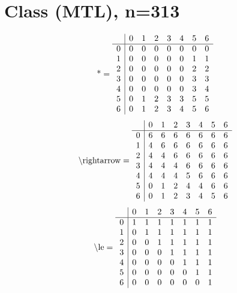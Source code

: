\documentclass[11pt]{article}
\begin{document}
\section{Class (MTL), n=313}
\[\text{*} = 
\begin{array}{r | r r r r r r r}
 & 0 & 1 & 2 & 3 & 4 & 5 & 6 \\ \hline
0 & 0 & 0 & 0 & 0 & 0 & 0 & 0 \\
1 & 0 & 0 & 0 & 0 & 0 & 1 & 1 \\
2 & 0 & 0 & 0 & 0 & 0 & 2 & 2 \\
3 & 0 & 0 & 0 & 0 & 0 & 3 & 3 \\
4 & 0 & 0 & 0 & 0 & 0 & 3 & 4 \\
5 & 0 & 1 & 2 & 3 & 3 & 5 & 5 \\
6 & 0 & 1 & 2 & 3 & 4 & 5 & 6 \\
\end{array}
\]
\[\text{\textbackslash rightarrow} = 
\begin{array}{r | r r r r r r r}
 & 0 & 1 & 2 & 3 & 4 & 5 & 6 \\ \hline
0 & 6 & 6 & 6 & 6 & 6 & 6 & 6 \\
1 & 4 & 6 & 6 & 6 & 6 & 6 & 6 \\
2 & 4 & 4 & 6 & 6 & 6 & 6 & 6 \\
3 & 4 & 4 & 4 & 6 & 6 & 6 & 6 \\
4 & 4 & 4 & 4 & 5 & 6 & 6 & 6 \\
5 & 0 & 1 & 2 & 4 & 4 & 6 & 6 \\
6 & 0 & 1 & 2 & 3 & 4 & 5 & 6 \\
\end{array}
\]
\[\text{\textbackslash le} = 
\begin{array}{r | r r r r r r r}
 & 0 & 1 & 2 & 3 & 4 & 5 & 6 \\ \hline
0 & 1 & 1 & 1 & 1 & 1 & 1 & 1 \\
1 & 0 & 1 & 1 & 1 & 1 & 1 & 1 \\
2 & 0 & 0 & 1 & 1 & 1 & 1 & 1 \\
3 & 0 & 0 & 0 & 1 & 1 & 1 & 1 \\
4 & 0 & 0 & 0 & 0 & 1 & 1 & 1 \\
5 & 0 & 0 & 0 & 0 & 0 & 1 & 1 \\
6 & 0 & 0 & 0 & 0 & 0 & 0 & 1 \\
\end{array}
\]
\end{document}
